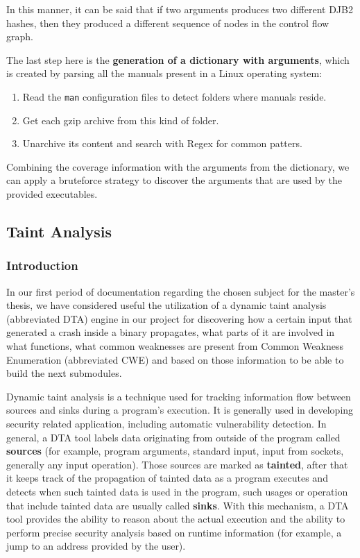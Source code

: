 \documentclass[12pt,a4paper,english,onecolumn]{IEEEtran}
\begin{document}
In this manner, it can be said that if two arguments produces two different DJB2 hashes, then they produced a different sequence of nodes in the control flow graph.

The last step here is the \textbf{generation of a dictionary with arguments}, which is created by parsing all the manuals present in a Linux operating system:
\begin{enumerate}
    \item Read the \texttt{man} configuration files to detect folders where manuals reside.
    \item  Get each gzip archive from this kind of folder.
    \item  Unarchive its content and search with Regex for common patters.
\end{enumerate}

Combining the coverage information with the arguments from the dictionary, we can apply a bruteforce strategy to discover the arguments that are used by the provided executables.

\subsection{Taint Analysis}

\subsubsection{Introduction}

In our first period of documentation regarding the chosen subject for the master's thesis, we have considered useful the utilization of a dynamic taint analysis (abbreviated DTA) engine in our project for discovering how a certain input that generated a crash inside a binary propagates, what parts of it are involved in what functions, what common weaknesses are present from Common Weakness Enumeration (abbreviated CWE) and based on those information to be able to build the next submodules.

Dynamic taint analysis is a technique used for tracking information flow between sources and sinks during a program's execution. It is generally used in developing security related application, including automatic vulnerability detection. In general, a DTA tool labels data originating from outside of the program called \textbf{sources} (for example, program arguments, standard input, input from sockets, generally any input operation). Those sources are marked as \textbf{tainted}, after that it keeps track of the propagation of tainted data as a program executes and detects when such tainted data is used in the program, such usages or operation that include tainted data are usually called \textbf{sinks}. With this mechanism, a DTA tool provides the ability to reason about the actual execution and the ability to perform precise security analysis based on runtime information (for example, a jump to an address provided by the user).
\end{document}
